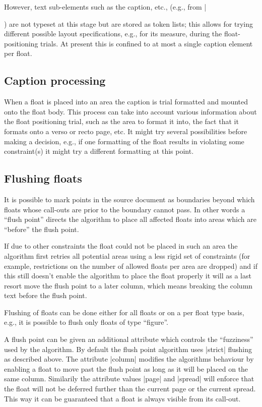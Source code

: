 \documentclass[twocolumn]{article}
\begin{document}
However, text sub-elements such as the caption, etc., (e.g., from
|\caption|) are not typeset at this stage but are stored as token
lists; this allows for trying different possible layout specifications,
e.g., for its measure, during the float-positioning trials.  At present
this is confined to at most a single caption element per float.

\subsection{Caption processing}

When a float is placed into an area the caption is trial formatted and
mounted onto the float body. This process can take into account
various information about the float positioning trial, such as the
area to format it into, the fact that it formats onto a verso or recto
page, etc. It might try several possibilities before making a decision,
e.g., if one formatting of the float results in violating some
constraint(s) it might try a different formatting at this point.



\subsection{Flushing floats}

It is possible to mark points in the source document as boundaries beyond
which floats whose call-outs are prior to the boundary cannot pass. In
other words a ``flush point'' directs the algorithm to place all
affected floats into areas which are ``before'' the flush point.

If due to other constraints the float could not be placed in such an
area the algorithm first retries all potential areas using a less
rigid set of constraints (for example, restrictions on the number of
allowed floats per area are dropped) and if this still doesn't enable
the algorithm to place the float properly it will as a last resort
move the flush point to a later column, which means breaking the
column text before the flush point.

Flushing of floats can be done either for all floats or on a
per float type basis, e.g., it is possible to flush only floats of
type ``figure''.

A flush point can be given an additional attribute which controls the
``fuzziness'' used by the algorithm. By default the flush point
algorithm uses |strict| flushing as described above. The attribute
|column| modifies the algorithms behaviour by enabling a float to move
past the flush point as long as it will be placed on the same
column. Similarily the attribute values |page| and |spread| will
enforce that the float will not be deferred further than the current
page or the current spread. This way it can be guaranteed that a float
is always visible from its call-out.
\end{document}
